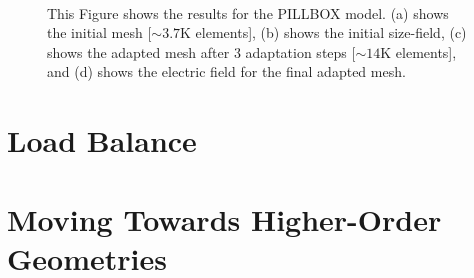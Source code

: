 \documentclass[review,authoryear,12pt]{elsarticle_summary_report}
\begin{document}
\begin{landscape}
\begin{figure}[ph!]
\centering
{}
\hspace*{50pt}
\\
\hspace*{50pt}
\caption{This Figure shows the results for the PILLBOX model. (a) shows the initial mesh [$\sim3.7\text{K}$ elements], (b) shows the initial size-field, (c) shows the adapted mesh after 3 adaptation steps [$\sim14\text{K}$ elements], and (d) shows the electric field for the final adapted mesh.}
\end{figure}
\end{landscape}



\section{Load Balance}

\section{Moving Towards Higher-Order Geometries}

% 
%  
\end{document}

